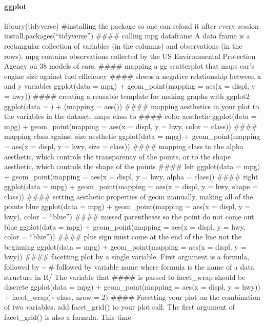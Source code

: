 \documentclass[
]{article}
\begin{document}
\hypertarget{ggplot}{%
\paragraph{ggplot}\label{ggplot}}

library(tidyverse) \#installing the package so one can reload it after
every session install.packages(``tidyverse'') \#\#\#\# calling mpg
dataframe A data frame is a rectangular collection of variables (in the
columns) and observations (in the rows). mpg contains observations
collected by the US Environmental Protection Agency on 38 models of
cars. \#\#\#\# mapping a gg scatterplot that maps car's engine size
against fuel efficiency \#\#\#\# shwos a negative relationship between x
and y variables ggplot(data = mpg) + geom\_point(mapping = aes(x =
displ, y = hwy)) \#\#\#\# creating a reusable template for making graphs
with ggplot2 ggplot(data = ) + (mapping = aes()) \#\#\#\# mapping
aesthetics in your plot to the variables in the dataset, maps class to
\#\#\#\# color aesthetic ggplot(data = mpg) + geom\_point(mapping =
aes(x = displ, y = hwy, color = class)) \#\#\#\# mapping class against
size aesthetic ggplot(data = mpg) + geom\_point(mapping = aes(x = displ,
y = hwy, size = class)) \#\#\#\# mapping class to the alpha aesthetic,
which controls the transparency of the points, or to the shape
aesthetic, which controls the shape of the points \#\#\#\# left
ggplot(data = mpg) + geom\_point(mapping = aes(x = displ, y = hwy, alpha
= class)) \#\#\#\# right ggplot(data = mpg) + geom\_point(mapping =
aes(x = displ, y = hwy, shape = class)) \#\#\#\# setting aesthetic
properties of geom manually, making all of the points blue ggplot(data =
mpg) + geom\_point(mapping = aes(x = displ, y = hwy), color = ``blue'')
\#\#\#\# missed parentheses so the point do not come out blue
ggplot(data = mpg) + geom\_point(mapping = aes(x = displ, y = hwy, color
= ``blue'')) \#\#\#\# plus sign must come at the end of the line not the
beginning ggplot(data = mpg) + geom\_point(mapping = aes(x = displ, y =
hwy)) \#\#\#\# facetting plot by a single variable. First argument is a
formula, followed by \textasciitilde{} \# followed by variable name
where formula is the name of a data structure in R/ The variable that
\#\#\#\# is passed to facet\_wrap should be discrete ggplot(data = mpg)
+ geom\_point(mapping = aes(x = displ, y = hwy)) +
facet\_wrap(\textasciitilde{} class, nrow = 2) \#\#\#\# Facetting your
plot on the combination of two variables, add facet\_grid() to your plot
call. The first argument of facet\_grid() is also a formula. This time
\end{document}
